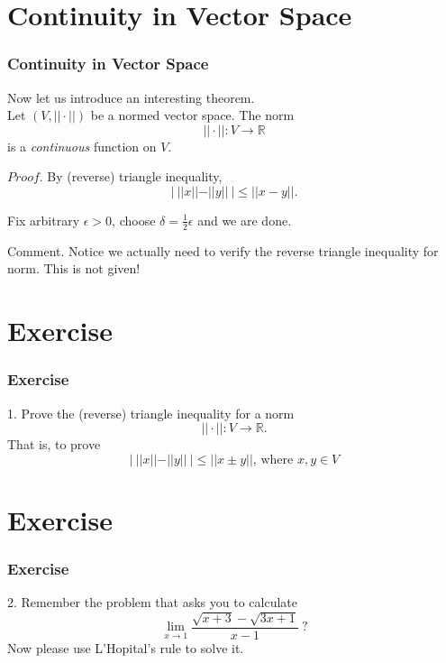 \documentclass[12pt, t]{beamer}
\renewcommand{\emph}[1]{{\color{Turquoise3}\textsl{#1}}}
\begin{document}
\section{Continuity in Vector Space}
\begin{frame}
    \frametitle{Continuity in Vector Space}
Now let us introduce an interesting theorem. \\
\vspace{1em}
\hspace{1em}
Let $(V,||\cdot||)$ be a normed vector space. The norm 
\begin{equation*}
    ||\cdot||:V\rightarrow \mathbb{R}
\end{equation*}
is a \emph{continuous} function on $V$.

\vspace{1em}
$Proof.$ \hspace{1em} 
By (reverse) triangle inequality, 
\begin{equation*}
    |\ ||x||-||y||\ |\leq ||x-y||.
\end{equation*}

Fix arbitrary $\epsilon>0$, choose $\delta=\frac{1}{2}\epsilon$ and we are done.

\vspace{1em}
Comment. Notice we actually need to verify the reverse triangle inequality for norm. This is not given!
\end{frame}

\section{Exercise}
\begin{frame}
    \frametitle{Exercise}
1. Prove the (reverse) triangle inequality for a norm
\begin{equation*}
    ||\cdot||:V\rightarrow \mathbb{R}. 
\end{equation*}
That is, to prove 
\begin{equation*}
    |\ ||x||-||y||\ |\leq ||x\pm y||\text{, where }x,y\in V
\end{equation*}
\end{frame}

\section{Exercise}
\begin{frame}
    \frametitle{Exercise}
2. Remember the problem that asks you to calculate
\begin{equation*}
    \underset{x\rightarrow 1}{\lim}\frac{\sqrt{x+3}-\sqrt{3x+1}}{x-1}\ ?
\end{equation*} 
Now please use L'Hopital's rule to solve it. 
\end{frame}
\end{document}
